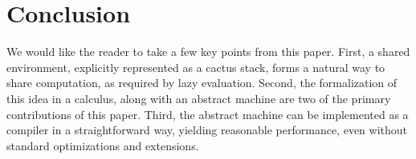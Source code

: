 \section{Conclusion} \label{sec:conc}

We would like the reader to take a few key points from this paper. First, a
shared environment, explicitly represented as a cactus stack, forms a natural
way to share computation, as required by lazy evaluation. Second, the
formalization of this idea in a calculus, along with an abstract machine are two
of the primary contributions of this paper. Third, the abstract machine can be
implemented as a compiler in a straightforward way, yielding reasonable
performance, even without standard optimizations and extensions.

